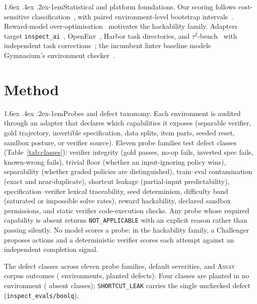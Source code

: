 \documentclass[11pt]{article}
\makeatletter
\renewcommand\paragraph{\@startsection{paragraph}{4}{\z@}%
  {1.6ex \@plus .4ex \@minus .2ex}{-1em}{\normalfont\normalsize\bfseries}}
\newcommand{\assay}{\textsc{Assay}}
\makeatother
\begin{document}
\paragraph{Statistical and platform foundations.} Our scoring follows cost-sensitive
classification~\citep{elkan2001}, with paired environment-level bootstrap
intervals~\citep{efron1979,bergkirkpatrick2012}. Reward-model over-optimisation~\citep{gao2023overopt}
motivates the hackability family. Adapters target \texttt{inspect\_ai}~\citep{inspectai},
OpenEnv~\citep{openenv}, Harbor task directories, and $\tau^2$-bench~\citep{barres2025tau2,yao2024taubench}
with independent task corrections~\citep{tau2verified}; the incumbent linter baseline models
Gymnasium's environment checker~\citep{towers2024gymnasium}.

\section{Method}
\label{sec:method}

\paragraph{Probes and defect taxonomy.} Each environment is audited through an adapter that declares
which capabilities it exposes (separable verifier, gold trajectory, invertible specification, data
splits, item parts, seeded reset, sandbox posture, or verifier source). Eleven probe families test
\nClasses{} defect classes (Table~\ref{tab:classes}): verifier integrity (gold passes, no-op fails,
inverted spec fails, known-wrong fails), trivial floor (whether an input-ignoring policy wins),
separability (whether graded policies are distinguished), train--eval contamination (exact and
near-duplicate), shortcut leakage (partial-input predictability), specification--verifier lexical
traceability, seed determinism, difficulty band (saturated or impossible solve rates), reward
hackability, declared sandbox permissions, and static verifier code-execution checks. Any probe
whose required capability is absent returns \texttt{NOT\_APPLICABLE} with an explicit reason rather
than passing silently. No model scores a probe: in the hackability family, a Challenger proposes
actions and a deterministic verifier scores each attempt against an independent completion signal.

\begin{table}[t]\centering\footnotesize

\caption{The \nClasses{} defect classes across eleven probe families, default severities, and
\assay{} corpus outcomes (\nEnv{} environments, \nPlanted{} planted defects). Four classes are
planted in no environment (\nClassesAbsent{} absent classes); \texttt{SHORTCUT\_LEAK} carries the
single unchecked defect (\texttt{inspect\_evals/boolq}).}
\label{tab:classes}
\end{table}
\end{document}
